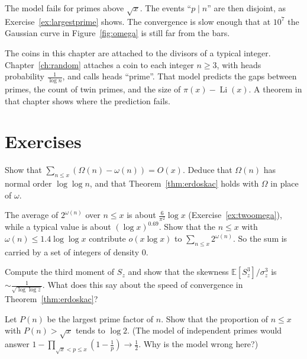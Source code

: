 The model fails for primes above $\sqrt x$. The events ``$p\mid n$'' are then disjoint, as Exercise~\ref{ex:largestprime} shows. The convergence is slow enough that at $10^7$ the Gaussian curve in Figure~\ref{fig:omega} is still far from the bars.

The coins in this chapter are attached to the divisors of a typical integer. Chapter~\ref{ch:random} attaches a coin to each integer $n\ge 3$, with heads probability $\frac1{\log n}$, and calls heads ``prime''. That model predicts the gaps between primes, the count of twin primes, and the size of $\pi(x)-\operatorname{Li}(x)$. A theorem in that chapter shows where the prediction fails.

\section{Exercises}

\begin{exercise}[$\star$]\label{ex:omegaOmega}
Show that $\sum_{n\le x}(\Omega(n)-\omega(n))=O(x)$. Deduce that $\Omega(n)$ has normal order $\log\log n$, and that Theorem~\ref{thm:erdoskac} holds with $\Omega$ in place of $\omega$.
\end{exercise}

\begin{exercise}[$\star$]\label{ex:taumean}
The average of $2^{\omega(n)}$ over $n\le x$ is about $\frac6{\pi^2}\log x$ (Exercise~\ref{ex:twoomega}), while a typical value is about $(\log x)^{0.69}$. Show that the $n\le x$ with $\omega(n)\le1.4\log\log x$
contribute $o(x\log x)$ to $\sum_{n\le x}2^{\omega(n)}$. So the sum is carried by a set of integers of density $0$.
\end{exercise}

\begin{exercise}[$\star$]\label{ex:skew}
Compute the third moment of $S_z$ and show that the skewness $\mathbb E[S_z^3]/\sigma_z^3$ is $\sim\frac1{\sqrt{\log\log z}}$. What does this say about the speed of convergence in Theorem~\ref{thm:erdoskac}?
\end{exercise}

\begin{exercise}[$\star\star$]\label{ex:largestprime}
Let $P(n)$ be the largest prime factor of $n$. Show that the proportion of $n\le x$ with $P(n)>\sqrt x$ tends to $\log2$. (The model of independent primes would answer $1-\prod_{\sqrt x<p\le x}(1-\frac1p)\to\frac12$. Why is the model wrong here?)
\end{exercise}

